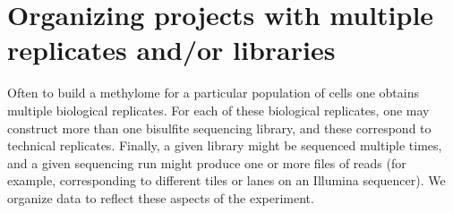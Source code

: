 \documentclass[10pt]{article}
\newcommand{\prog}[1]{\texttt{#1}}
\newcommand{\fn}[1]{\texttt{#1}}
\newcommand{\lit}[1]{\texttt{#1}}
\begin{document}



\section{Organizing projects with multiple replicates and/or libraries}
\label{sec:organ-datas-with}

Often to build a methylome for a particular population of cells one
obtains multiple biological replicates. For each of these biological
replicates, one may construct more than one bisulfite sequencing
library, and these correspond to technical replicates. Finally, a
given library might be sequenced multiple times, and a given
sequencing run might produce one or more files of reads (for example,
corresponding to different tiles or lanes on an Illumina
sequencer). We organize data to reflect these aspects of the experiment.
\end{document}
